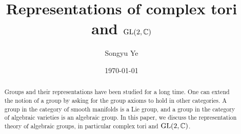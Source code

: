 \documentclass{amsart}
\numberwithin{equation}{section}
\theoremstyle{plain} %
\theoremstyle{definition}
\theoremstyle{remark}
\begin{document}
\title{Representations of complex tori and $\operatorname{GL}(2,\mathbb{C})$}


\author{Songyu Ye} 

\address{}






\date{\today}

\begin{abstract}
	Groups and their representations have been studied for a long time. One can extend the
	notion of a group by asking for the group axioms to hold in other categories. A group in
	the category of smooth manifolds is a Lie group, and a group in the category of algebraic varieties
	is an algebraic group. In this paper, we discuss the representation theory of algebraic groups,
	in particular complex tori and $\operatorname{GL}(2,\mathbb{C})$.
\end{abstract}


\maketitle



\end{document}
